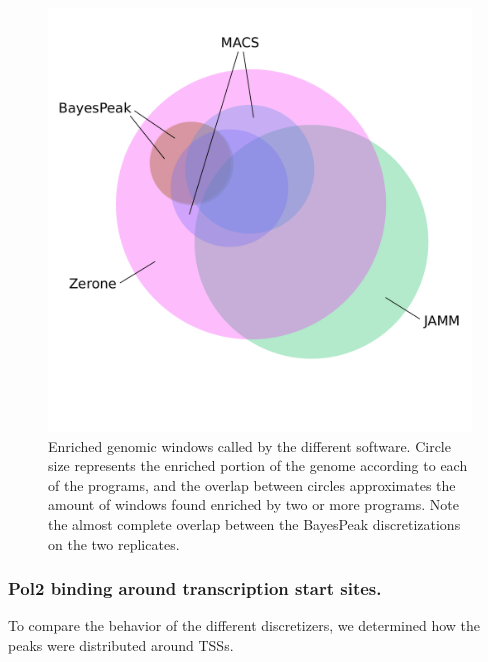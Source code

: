 \documentclass{bioinfo}
\begin{document}
\begin{figure}[!tpb]
\centerline{\includegraphics[scale=0.5]{histone_venn_color_names.pdf}}
\caption{Enriched genomic windows called by the different software. Circle size
represents the enriched portion of the genome according to each of the programs,
and the overlap between circles approximates the amount of windows found
enriched by two or more programs. Note the almost complete overlap between the
BayesPeak discretizations on the two replicates.}\label{fig:venn}
\end{figure}

\subsubsection{Pol2 binding around transcription start sites.}
To compare the behavior of the different discretizers, we determined how the
peaks were distributed around TSSs.
\end{document}
